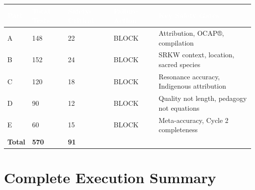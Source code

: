 \documentclass[11pt,letterpaper]{article}
\newcommand{\tblhdr}[1]{\textbf{\sffamily\textcolor{white}{#1}}}
\begin{document}
\begin{center}
\begin{tabularx}{\textwidth}{L{2cm}C{2cm}C{2.5cm}C{2.5cm}X}
\toprule
{}
\tblhdr{Part} & \tblhdr{Total Tests} & \tblhdr{Safety-Critical} & \tblhdr{Failure Action} & \tblhdr{Key Safety Gates} \\
\midrule
A & 148 & 22 & BLOCK & Attribution, OCAP®, compilation \\
B & 152 & 24 & BLOCK & SRKW context, location, sacred species \\
C & 120 & 18 & BLOCK & Resonance accuracy, Indigenous attribution \\
D & 90 & 12 & BLOCK & Quality not length, pedagogy not equations \\
E & 60 & 15 & BLOCK & Meta-accuracy, Cycle 2 completeness \\
\midrule
{}
\textbf{Total} & \textbf{570} & \textbf{91} & & \\
\bottomrule
\end{tabularx}
\end{center}

\section{Complete Execution Summary}
\end{document}
